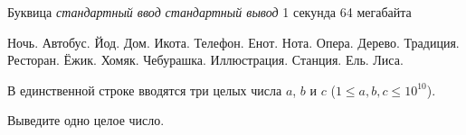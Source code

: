 \begin{problem}%
{Буквица}%
{\textsl{стандартный ввод}}%
{\textsl{стандартный вывод}}%
{1 секунда}%
{64 мегабайта}{}

Ночь. Автобус. Йод. Дом. Икота. Телефон. Енот. Нота. Опера. Дерево. Традиция. Ресторан. Ёжик. Хомяк. Чебурашка. Иллюстрация. Станция. Ель. Лиса.

\InputFile

В единственной строке вводятся три целых числа $a$, $b$ и $c$ ($1 \le a, b, c \le 10^{10}$).

\OutputFile

Выведите одно целое число.

\Examples

\begin{example}
%
%
\end{example}
\end{problem}
